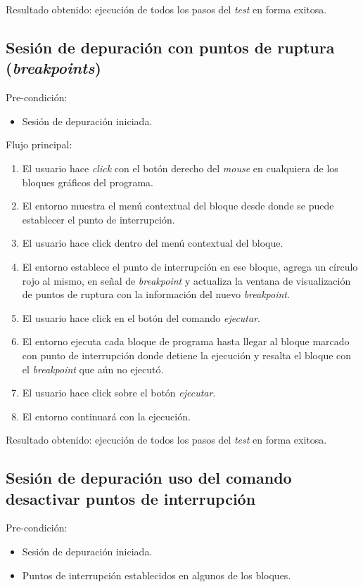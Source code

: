 Resultado obtenido: ejecución de todos los pasos del \emph{test} en forma exitosa.  


\subsection{Sesión de depuración con puntos de ruptura (\emph{breakpoints})}
Pre-condición:
\begin{itemize}
     \item Sesión de depuración iniciada.
\end{itemize}

Flujo principal:
\begin{enumerate}
	\item
	El usuario hace \emph{click} con el botón derecho del \emph{mouse} en cualquiera de los bloques gráficos del programa.
	\item
	El entorno muestra el menú contextual del bloque desde donde se puede establecer el punto de interrupción.
	\item
	El usuario hace click dentro del menú contextual del bloque.
	\item
	El entorno establece el punto de interrupción en ese bloque, agrega un círculo rojo al mismo, en señal de \emph{breakpoint} y actualiza la ventana de visualización de puntos de ruptura con la información del nuevo \emph{breakpoint}.
	\item
	El usuario hace click en el botón del comando \emph{ejecutar}.
	\item
	El entorno ejecuta cada bloque de programa hasta llegar al bloque marcado con punto de interrupción donde detiene la ejecución y resalta el bloque con el \emph{breakpoint} que aún no ejecutó.
	\item
    El usuario hace click sobre el botón \emph{ejecutar}.
    \item
    El entorno continuará con la ejecución.
\end{enumerate}

Resultado obtenido: ejecución de todos los pasos del \emph{test} en forma exitosa. 


\subsection{Sesión de depuración uso del comando desactivar puntos de interrupción}
Pre-condición:
\begin{itemize}
	\item Sesión de depuración iniciada.
	\item Puntos de interrupción establecidos en algunos de los bloques.
\end{itemize}

